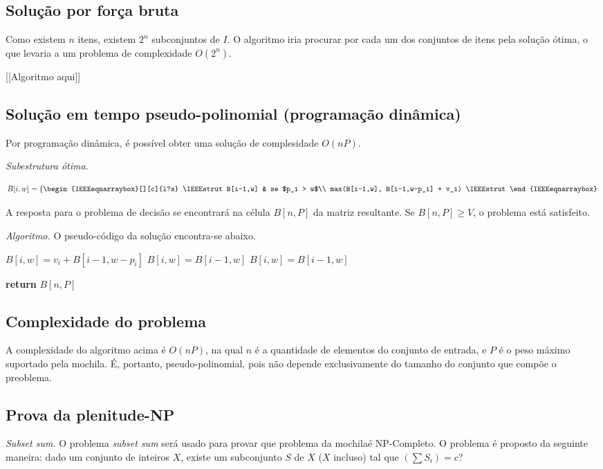 \documentclass[a4paper]{article}
\newcommand{\ks}{problema da mochila}
\newcommand{\NPC}{NP-Completo}
\begin{document}
\subsection*{Solução por força bruta}
Como existem $n$ itens, existem $2^n$ subconjuntos de $I$. O algoritmo iria procurar por cada um dos conjuntos de itens pela solução ótima, o que levaria a um problema de complexidade $O(2^n)$.

[[Algoritmo aqui]]

\subsection*{Solução em tempo pseudo-polinomial (programação dinâmica)}
Por programação dinâmica, é possível obter uma solução de complesidade $O(nP)$.

{\it Subestrutura ótima.}

\[
B[i,w] = \left\{
\begin{IEEEeqnarraybox}[][c]{l?s}
\IEEEstrut
B[i-1,w] & se $p_i > w$\\
max(B[i-1,w], B[i-1,w-p_i] + v_i)
\IEEEstrut
\end{IEEEeqnarraybox}
\right.
\]

A resposta para o problema de decisão se encontrará na célula $B[n,P]$ da matriz resultante. Se $B[n,P] \ge V$, o problema está satisfeito.

{\it Algoritmo.} O pseudo-código da solução encontra-se abaixo.
\begin{algorithmic}
    \STATE $B[i,w] = v_i + B[i-1,w-p_i]$
   \ELSE
    \STATE $B[i,w] = B[i-1,w]$
   \ENDIF
  \ELSE 
   \STATE $B[i,w] = B[i-1,w]$
  \ENDIF
 \ENDFOR
\ENDFOR

{\bf return} $B[n,P]$
\end{algorithmic}

\subsection*{Complexidade do problema}
A complexidade do algoritmo acima é $O(nP)$, na qual $n$ é a quantidade de elementos do conjunto de entrada, e $P$ é o peso máximo suportado pela mochila. É, portanto, pseudo-polinomial, pois não depende exclusivamente do tamanho do conjunto que compõe o preoblema.

\subsection*{Prova da plenitude-NP}
{\it Subset sum.} O problema {\it subset sum} será usado para provar que \ks é \NPC. O problema é proposto da seguinte maneira: dado um conjunto de inteiros $X$, existe um subconjunto $S$ de $X$ ($X$ incluso) tal que $\left(\sum S_i\right) = c$?
\end{document}
